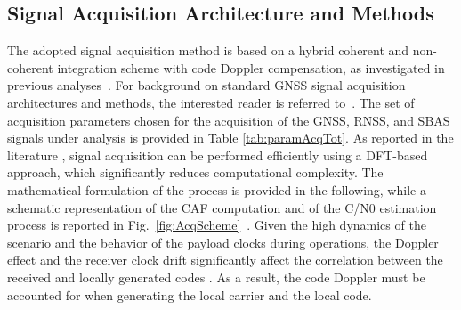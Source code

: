\documentclass{IEEEtaes}
\begin{document}

\subsection{Signal Acquisition Architecture and Methods}
\label{sec:acqStrategyMeth}
The adopted signal acquisition method is based on a hybrid coherent and non-coherent integration scheme with code Doppler compensation, as investigated in previous analyses~\cite{nardin2022acquisition}. For background on standard \gls{GNSS} signal acquisition architectures and methods, the interested reader is referred to~\cite{kaplan2017understanding}. 
The set of acquisition parameters chosen for the acquisition of the \gls{GNSS}, \gls{RNSS}, and \gls{SBAS} signals under analysis is provided in Table \ref{tab:paramAcqTot}. 
As reported in the literature \cite{van1991new, tsui2004fundamentals, borio2008statistical}, signal acquisition can be performed efficiently using a \gls{DFT}-based approach, which significantly reduces computational complexity. The mathematical formulation of the process is provided in the following, while a schematic representation of the \gls{CAF} computation and of the \gls{C/N0} estimation process is reported in Fig.~\ref{fig:AcqScheme}~\cite{kaplan2017understanding}.
Given the high dynamics of the scenario and the behavior of the payload clocks during operations, the Doppler effect and the  receiver clock drift significantly affect the correlation between the received and locally generated codes \cite{foucras2014detailed, sciacca2025acquiring}. As a result, the code Doppler must be accounted for when generating the local carrier and the local code.
\end{document}
